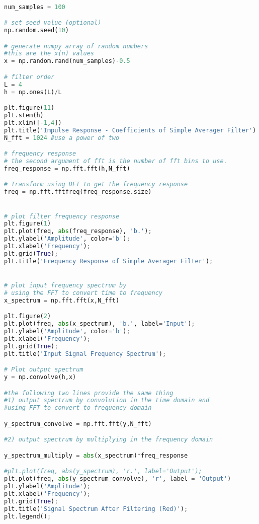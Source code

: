 \begin{lstlisting}[language = Python]

num_samples = 100

# set seed value (optional)
np.random.seed(10)

# generate numpy array of random numbers
#this are the x(n) values 
x = np.random.rand(num_samples)-0.5

# filter order
L = 4
h = np.ones(L)/L

plt.figure(11)
plt.stem(h)
plt.xlim([-1,4])
plt.title('Impulse Response - Coefficients of Simple Averager Filter')
N_fft = 1024 #use a power of two

# frequency response
# the second argument of fft is the number of fft bins to use.
freq_response = np.fft.fft(h,N_fft)

# Transform using DFT to get the frequency response
freq = np.fft.fftfreq(freq_response.size)


# plot filter frequency response
plt.figure(1)
plt.plot(freq, abs(freq_response), 'b.');
plt.ylabel('Amplitude', color='b');
plt.xlabel('Frequency');
plt.grid(True);
plt.title('Frequency Response of Simple Averager Filter');


# plot input frequency spectrum by
# using the FFT to convert time to frequency
x_spectrum = np.fft.fft(x,N_fft)

plt.figure(2)
plt.plot(freq, abs(x_spectrum), 'b.', label='Input');
plt.ylabel('Amplitude', color='b');
plt.xlabel('Frequency');
plt.grid(True);
plt.title('Input Signal Frequency Spectrum');

# Plot output spectrum
y = np.convolve(h,x)

#the following two lines provide the same thing
#1) output spectrum by convolution in the time domain and 
#using FFT to convert to frequency domain

y_spectrum_convolve = np.fft.fft(y,N_fft)

#2) output spectrum by multiplying in the frequency domain

y_spectrum_multiply = abs(x_spectrum)*freq_response

#plt.plot(freq, abs(y_spectrum), 'r.', label='Output');
plt.plot(freq, abs(y_spectrum_convolve), 'r', label = 'Output')
plt.ylabel('Amplitude');
plt.xlabel('Frequency');
plt.grid(True);
plt.title('Signal Spectrum After Filtering (Red)');
plt.legend();
\end{lstlisting}






